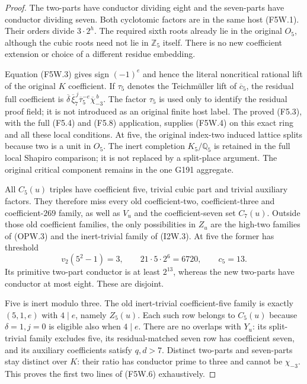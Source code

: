 \begin{proof}
The two-parts have conductor dividing eight and the seven-parts
have conductor dividing seven. Both cyclotomic factors are in
the same host (F5W.1). Their orders divide $3\cdot2^h$.
The required sixth roots already lie in the original $O_5$,
although the cubic roots need not lie in $\mathbb Z_5$ itself.
There is no new coefficient extension or choice of a different
residue embedding.

Equation (F5W.3) gives sign $(-1)^e$ and hence the literal
noncritical rational lift of the original $K$ coefficient.
If $\tau_5$ denotes the Teichm\"uller lift of $\overline c_5$,
the residual full coefficient is
$\overline\delta\,\overline\xi_7^{\,j}
 \overline\tau_5^{-e}\overline\chi_{-3}^{\,b}$.
The factor $\tau_5$ is used only to identify the residual proof
field; it is not introduced as an original finite host label.
The proved (F5.3), with the full (F5.4) and (F5.8) application,
supplies (F5W.4) on this exact ring and all these local conditions. At five, the original index-two
induced lattice splits because two is a unit in $O_5$.
The inert completion $K_5/\mathbb Q_5$ is retained in the full
local Shapiro comparison; it is not replaced by a split-place
argument. The original critical component remains in the one
G191 aggregate.

All $C_5(u)$ triples have coefficient five, trivial cubic part
and trivial auxiliary factors. They therefore miss every old
coefficient-two, coefficient-three and coefficient-$269$ family,
as well as $V_u$ and the coefficient-seven set $C_7(u)$.
Outside those old coefficient families, the only possibilities
in $Z_u$ are the high-two families of (OPW.3) and the inert-trivial
family of (I2W.3). At five the former has threshold
\[
 v_2(5^2-1)=3,\qquad21\cdot5\cdot2^6=6720,
 \qquad c_5=13.
 \tag{F5W.9}
\]
Its primitive two-part conductor is at least $2^{13}$, whereas
the new two-parts have conductor at most eight. These are disjoint.

Five is inert modulo three. The old inert-trivial coefficient-five
family is exactly $(5,1,e)$ with $4\mid e$, namely $Z_5(u)$.
Each such row belongs to $C_5(u)$ because $\delta=1,j=0$
is eligible also when $4\mid e$.
There are no overlaps with $Y_u$: its split-trivial family excludes
five, its residual-matched seven row has coefficient seven, and
its auxiliary coefficients satisfy $q,d>7$.
Distinct two-parts and seven-parts stay distinct over $K$:
their ratio has conductor prime to three and cannot be $\chi_{-3}$.
This proves the first two lines of (F5W.6) exhaustively.


\end{proof}
